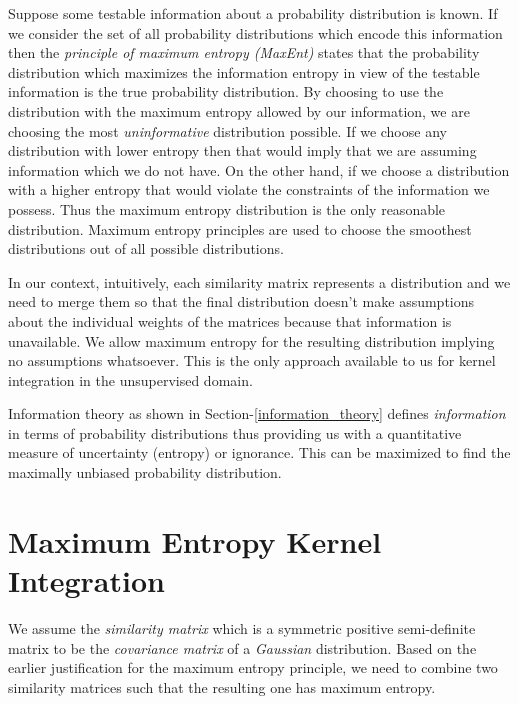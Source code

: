 Suppose some testable information about a probability distribution is known. If we consider the set of all probability distributions which encode this information then the \textit{principle of maximum entropy (MaxEnt)} states that the probability distribution which maximizes the information entropy in view of the testable information is the true probability distribution. By choosing to use the distribution with the maximum entropy allowed by our information, we are choosing the most \textit{uninformative} distribution possible. If we choose any distribution with lower entropy then that would imply that we are assuming information which we do not have. On the other hand, if we choose a distribution with a higher entropy that would violate the constraints of the information we possess. Thus the maximum entropy distribution is the only reasonable distribution. Maximum entropy principles are used to choose the smoothest distributions out of all possible distributions. 

In our context, intuitively, each similarity matrix represents a distribution and we need to merge them so that the final distribution doesn't make assumptions about the individual weights of the matrices because that information is unavailable. We allow maximum entropy for the resulting distribution implying no assumptions whatsoever. This is the only approach available to us for kernel integration in the unsupervised domain.

Information theory as shown in Section-\ref{information_theory} defines \textit{information} in terms of probability distributions thus providing us with a quantitative measure of uncertainty (entropy) or ignorance. This can be maximized to find the maximally unbiased probability distribution. 

\section{Maximum Entropy Kernel Integration} \label{kern_integration}

We assume the \textit{similarity matrix} which is a symmetric positive semi-definite matrix to be the \textit{covariance matrix} of a \textit{Gaussian} distribution. Based on the earlier justification for the maximum entropy principle, we need to combine two similarity matrices such that the resulting one has maximum entropy. 

